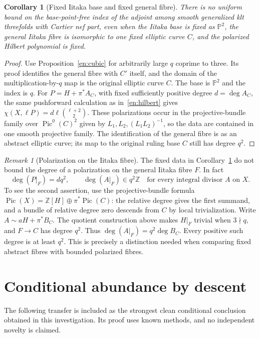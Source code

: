 \documentclass[12pt]{amsart}
\newtheorem{cor}[thm]{Corollary}
\theoremstyle{definition}
\theoremstyle{remark}
\newtheorem{rem}[thm]{Remark}
\numberwithin{equation}{section}
\newcommand{\Z}{\mathbb{Z}}
\newcommand{\mP}{\mathbb{P}}
\DeclareMathOperator{\Pic}{Pic}
\begin{document}
\begin{cor}[Fixed Iitaka base and fixed general fibre]\label{en:fixeddata}
There is no uniform bound on the base-point-free index of the adjoint among smooth generalized klt threefolds with Cartier nef part, even when the Iitaka base is fixed as $\mP^2$, the general Iitaka fibre is isomorphic to one fixed elliptic curve $C$, and the polarized Hilbert polynomial is fixed.
\end{cor}
\begin{proof}
Use Proposition~\ref{en:cubic} for arbitrarily large $q$ coprime to three. Its proof identifies the general fibre with $C'$ itself, and the domain of the multiplication-by-$q$ map is the original elliptic curve $C$. The base is $\mP^2$ and the index is $q$. For $P=H+\pi^*A_C$, with fixed sufficiently positive degree $d=\deg A_C$, the same pushforward calculation as in~\eqref{en:hilbert} gives $\chi(X,\ell P)=d\ell\binom{\ell+2}{2}$. These polarizations occur in the projective-bundle family over $\Pic^0(C)^2$ given by $L_1,L_2,(L_1L_2)^{-1}$, so the data are contained in one smooth projective family. The identification of the general fibre is as an abstract elliptic curve; its map to the original ruling base $C$ still has degree $q^2$.
\end{proof}

\begin{rem}[Polarization on the Iitaka fibre]\label{en:fibredegree}
The fixed data in Corollary~\ref{en:fixeddata} do not bound the degree of a polarization on the general Iitaka fibre $F$. In fact
\[
 \deg(P|_F)=dq^2,\qquad
 \deg(A|_F)\in q^2\Z\quad\text{for every integral divisor }A\text{ on }X.
\]
To see the second assertion, use the projective-bundle formula
$\Pic(X)=\Z[H]\oplus\pi^*\Pic(C)$: the relative degree gives the first summand, and a bundle of relative degree zero descends from $C$ by local trivialization. Write $A\sim aH+\pi^*B_C$. The quotient construction above makes $H|_F$ trivial when $3\nmid q$, and $F\to C$ has degree $q^2$. Thus $\deg(A|_F)=q^2\deg B_C$. Every positive such degree is at least $q^2$. This is precisely a distinction needed when comparing fixed abstract fibres with bounded polarized fibres.
\end{rem}

\section{Conditional abundance by descent}\label{en:descent}
The following transfer is included as the strongest clean conditional conclusion obtained in this investigation. Its proof uses known methods, and no independent novelty is claimed.
\end{document}
